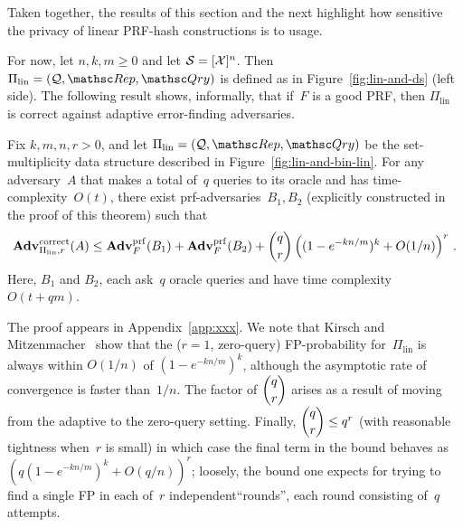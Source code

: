 Taken together, the results of this section and the next highlight how sensitive the privacy of linear PRF-hash constructions is to usage.


For now, let $n,k,m \geq 0$ and let $\mathcal{S}=[{\cal X}]^n$.  Then $\Pi_{\mathrm{lin}}= (\calQ,\Rep, \Qry)$ is defined as in Figure~\ref{fig:lin-and-ds} (left side).  The following result shows, informally, that if~$F$ is a good PRF, then $\Pi_\mathrm{lin}$ is correct against adaptive error-finding adversaries.

\begin{theorem}\label{thm1}\label{thm:lin-correctness}
Fix $k,m,n,r>0$, and let $\Pi_{\mathrm{lin}}= (\calQ,\Rep, \Qry)$ be the set-multiplicity data structure described in Figure~\ref{fig:lin-and-bin-lin}.  For any adversary~$A$ that makes a total of~$q$ queries to its oracle and has time-complexity~$O(t)$, there exist prf-adversaries~$B_1,B_2$ (explicitly constructed in the proof of this theorem) such that
\[
\mathrm{\mathbf{Adv}}^{\mathrm{correct}}_{\Pi_{\mathrm{lin}},r}(A) \leq  \mathbf{Adv}^{\mathrm{prf}}_{F}(B_1) + \mathbf{Adv}^{\mathrm{prf}}_{F}(B_2)  +{\dbinom{q}{r}} \left( (1-e^{-kn/m})^k + O(1/n) \right)^r\,.
\]
Here, $B_1$ and $B_2$, each ask~$q$ oracle queries and have time complexity~$O(t+qm)$.
\end{theorem}
The proof appears in Appendix~\ref{app:xxx}.  We note that Kirsch and Mitzenmacher~\cite{xxx} show
that the ($r=1$, zero-query) FP-probability for~$\Pi_\mathrm{lin}$ is
always within $O(1/n)$ of $(1-e^{-kn/m})^k$, although the asymptotic
rate of convergence is faster than~$1/n$.  The factor of $\dbinom{q}{r}$ arises as a result
of moving from the adaptive to the zero-query setting.  Finally, $\dbinom{q}{r} \leq q^r$ (with
reasonable tightness when~$r$ is small) in which case the final term in the bound behaves as
$(q (1-e^{-kn/m})^k + O(q/n) )^r$; loosely, the bound one expects for
trying to find a single FP in each of~$r$ independent``rounds'', each round
consisting of~$q$ attempts.

